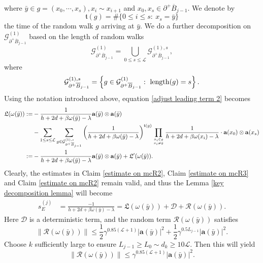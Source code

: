\documentclass[11pt,reqno,UTF8,twoside]{amsart}
\newcommand{\length}{{\rm length}}
\newcommand{\bfa}{\mathbf{a}}
\newcommand{\mcD}{\mathcal{D}}
\newcommand{\mcR}{\mathcal{R}}
\newcommand{\mcL}{\mathcal{L}}
\newcommand{\mcG}{\mathcal{G}}
\newcommand{\barB}{\overline{B}}
\newcommand{\smallSj}{s^{(j)}}
\theoremstyle{definition}
\numberwithin{equation}{section}
\begin{document}
where  $\bar{y}\in g=(x_0,\cdots,x_s),x_{i}\sim x_{i+1}$ and $x_0,x_s \in \partial^+ \barB_{j-1} $. We denote  by 
\[\mathfrak{t}(g)=\#\{0\leq i \leq s: \ x_s = \bar{y}\} \]
the time of the random walk $g$ arriving at  $\bar{y}$.
We do a further decomposition on $\mcG_{\partial^+ \barB_{j-1}}^{(1)}$ based on the length of random walks
\begin{equation*}
  \mcG_{\partial^+ \barB_{j-1}}^{(1)}=\bigcup_{0\leq s\leq \mcL} \mcG_{\partial^+ \barB_{j-1}}^{(1),s},
\end{equation*}
where 
\begin{equation*}
  \mcG_{\partial^+ \barB_{j-1}}^{(1),s}=\left\{  g\in \mcG_{\partial^+ \barB_{j-1}}^{(1)}: \ \length(g)=s \right\}.
\end{equation*}
Using the notation introduced above, equation \eqref{adjust leading term 2} becomes 
\begin{align}
 \mathfrak{L}(\omega(\bar{y})):=  &-  \frac{1}{h+2d+\beta \omega(\bar{y})-\lambda} \bfa(\bar{y})\otimes \bfa(\bar{y}) \\
   \notag  & -\sum_{1\leq s\leq \mcL} \sum_{g\in \mcG_{\partial^+ \barB_{j-1}}^{(1),s}} \left(\frac{1}{h+2d+\beta \omega(\bar{y})-\lambda}\right)^{\mathfrak{t}(g)} \prod_{x_i\in g \atop x_i\neq \bar{y}} \frac{1}{h+2d+\beta\omega(x_i)-\lambda} \cdot \bfa(x_0)\otimes \bfa(x_s) \\
  \notag :=& -  \frac{1}{h+2d+\beta \omega(\bar{y})-\lambda} \bfa(\bar{y})\otimes \bfa(\bar{y}) + \mathfrak{L}'(\omega(\bar{y})).
\end{align}
Clearly, the estimates in  Claim \ref{estimate on mcR2}, Claim \ref{estimate on mcR3} and Claim \ref{estimate on mcR2} remain valid, and thus the Lemma \ref{key decomposition lemma} will become 
  \begin{align*}
    \smallSj_E & = \frac{-1}{h+2d+\beta \omega(\bar{y})-\lambda} =\mathfrak{L}(\omega(\bar{y})) + \mcD + \mcR(\omega(\bar{y})) .
  \end{align*}
  Here $\mcD$ is a deterministic term, and the random term $\mcR(\omega(\bar{y}))$ satisfies
  \begin{equation*}
    \|\mcR(\omega(\bar{y}))\| \leq \frac{1}{2}\gamma^{0.85(\mcL+1)} |\bfa(\bar{y})|^2 + \frac{1}{2}\gamma^{0.5L_{j-1}} |\bfa(\bar{y})|^2.
  \end{equation*}
  Choose  $k$ sufficiently large to ensure $L_{j-1}\geq L_0\sim d_{k} \geq 10 \mcL$. Then this  will yield  
  \begin{equation}\label{adjust estimate on mcR}
     \|\mcR(\omega(\bar{y}))\| \leq \gamma^{0.85(\mcL+1)} |\bfa(\bar{y})|^2 .
  \end{equation}
\end{document}
